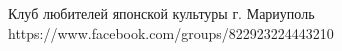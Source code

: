  
 
 
 
 

Клуб любителей японской культуры г. Мариуполь
https://www.facebook.com/groups/822923224443210
